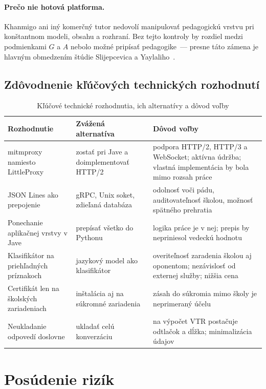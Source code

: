 \paragraph{Prečo nie hotová platforma.} Khanmigo ani iný komerčný tutor nedovolí manipulovať pedagogickú vrstvu pri konštantnom modeli, obsahu a rozhraní. Bez tejto kontroly by rozdiel medzi podmienkami $G$ a $A$ nebolo možné pripísať pedagogike~--- presne táto zámena je hlavným obmedzením štúdie Slijepcevica a Yaylaliho~\cite{slijepcevic2025khanmigo}.

\subsection{Zdôvodnenie kľúčových technických rozhodnutí}

\begin{table}[H]
\centering
\caption{Kľúčové technické rozhodnutia, ich alternatívy a dôvod voľby}
\label{tab:rozhodnutia}
\small
\begin{tabularx}{\textwidth}{@{}l X X@{}}
\toprule
\textbf{Rozhodnutie} & \textbf{Zvážená alternatíva} & \textbf{Dôvod voľby} \\
\midrule
mitmproxy namiesto LittleProxy & zostať pri Jave a doimplementovať HTTP/2 & podpora HTTP/2, HTTP/3 a WebSocket; aktívna údržba; vlastná implementácia by bola mimo rozsah práce \\
JSON Lines ako prepojenie & gRPC, Unix soket, zdieľaná databáza & odolnosť voči pádu, auditovateľnosť školou, možnosť spätného prehratia \\
Ponechanie aplikačnej vrstvy v Jave & prepísať všetko do Pythonu & logika práce je v nej; prepis by nepriniesol vedeckú hodnotu \\
Klasifikátor na priehľadných príznakoch & jazykový model ako klasifikátor & overiteľnosť zaradenia školou aj oponentom; nezávislosť od externej služby; nižšia cena \\
Certifikát len na školských zariadeniach & inštalácia aj na súkromné zariadenia & zásah do súkromia mimo školy je neprimeraný účelu \\
Neukladanie odpovedí doslovne & ukladať celú konverzáciu & na výpočet VTR postačuje odtlačok a dĺžka; minimalizácia údajov \\
\bottomrule
\end{tabularx}
\end{table}

\section{Posúdenie rizík}
\label{sec:rizika}

